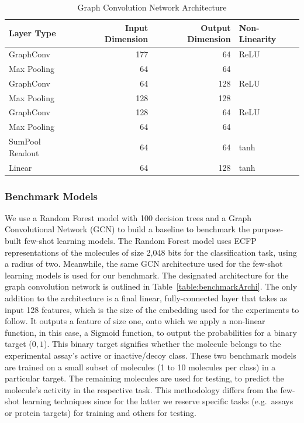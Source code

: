 \documentclass[journal=jcisd8,manuscript=article]{achemso} %
\begin{document}
\begin{table}
    \centering
    \begin{tabular}{@{}lrrl@{}}
    \hline
    \textbf{Layer Type} & \textbf{Input Dimension} & \textbf{Output Dimension} & \textbf{Non-Linearity} \\
    \hline
    GraphConv & 177 & 64 & ReLU \\
    Max Pooling & 64 & 64 & \\
    GraphConv & 64 & 128 & ReLU \\
    Max Pooling & 128 & 128 & \\
    GraphConv & 128 & 64 & ReLU \\
    Max Pooling & 64 & 64 & \\
    SumPool Readout & 64 & 64 & tanh \\
    Linear & 64 & 128 & tanh \\
    \hline  
    \end{tabular}
    \caption{Graph Convolution Network Architecture}
    \label{table:gcn-architecture}
\end{table}

\subsubsection{Benchmark Models}

We use a Random Forest model with 100 decision trees and a Graph Convolutional Network (GCN) to build a baseline to benchmark the purpose-built few-shot learning models. The Random Forest model uses ECFP representations of the molecules of size 2,048 bits for the classification task, using a radius of two. Meanwhile, the same GCN architecture used for the few-shot learning models is used for our benchmark. The designated architecture for the graph convolution network is outlined in Table~\ref{table:benchmarkArchi}. The only addition to the architecture is a final linear, fully-connected layer that takes as input 128 features, which is the size of the embedding used for the experiments to follow. It outputs a feature of size one, onto which we apply a non-linear function, in this case, a Sigmoid function, to output the probabilities for a binary target (${0, 1}$). This binary target signifies whether the molecule belongs to the experimental assay's active or inactive/decoy class. These two benchmark models are trained on a small subset of molecules (1 to 10 molecules per class) in a particular target. The remaining molecules are used for testing, to predict the molecule's activity in the respective task. This methodology differs from the few-shot learning techniques since for the latter we reserve specific tasks (e.g.\ assays or protein targets) for training and others for testing. 
\end{document}
